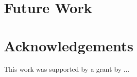 \documentclass[11pt,letterpaper]{article}
\begin{document}
\section{Future Work}


\section{Acknowledgements} 
This work was supported by a grant by ...




\end{document}

